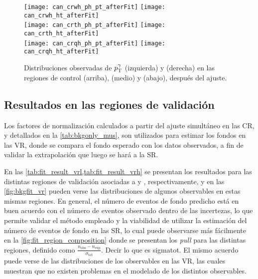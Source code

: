 \begin{figure}[!htb]
  \centering

  \texttt{[image: can\_crwh\_ph\_pt\_afterFit]}
  \texttt{[image: can\_crwh\_ht\_afterFit]} \\

  \texttt{[image: can\_crth\_ph\_pt\_afterFit]}
  \texttt{[image: can\_crth\_ht\_afterFit]} \\

  \texttt{[image: can\_crqh\_ph\_pt\_afterFit]}
  \texttt{[image: can\_crqh\_ht\_afterFit]} \\

  \caption{Distribuciones observadas de $p_{\mathrm{T}}^\gamma$ (izquierda) y {\HT} (derecha) en las
    regiones de control {\CRWH} (arriba), {\CRTH} (medio) y {\CRQH} (abajo),
    después del ajuste.}
  \label{fig:bkgfit_crh_after}

\end{figure}





\subsection{Resultados en las regiones de validación}

Los factores de normalización calculados a partir del ajuste simultáneo en las
CR, y detallados en la \cref{tab:bkgonly_mus}, son utilizados para estimar los fondos
en las VR, donde se compara el fondo esperado con los datos observados, a fin de
validar la extrapolación que luego se hará a la SR.

En las \cref{tab:fit_result_vrl,tab:fit_result_vrh} se presentan los resultados
para las distintas regiones de validación asociadas a {\SRL} y {\SRH},
respectivamente, y en las \cref{fig:bkgfit_vr} pueden verse las distribuciones
de algunos observables en estas mismas regiones. En general, el número de
eventos de fondo predicho está en buen acuerdo con el número de eventos
observado dentro de las incertezas, lo que permite validar el método empleado y
la viabilidad de utilizar la estimación del número de eventos de fondo en las
SR, lo cual puede observarse más fácilmente en la
\cref{fig:fit_region_composition} donde se presentan los \emph{pull} para las
distintas regiones, definido como $\frac{n_\text{obs} - n_\text{exp}}{\sigma_\text{tot}}$.
Decir lo que es sigmatot.
El mismo acuerdo puede verse de las distribuciones de los
observables en las VR, las cuales muestran que no existen problemas en el
modelado de los distintos observables.

